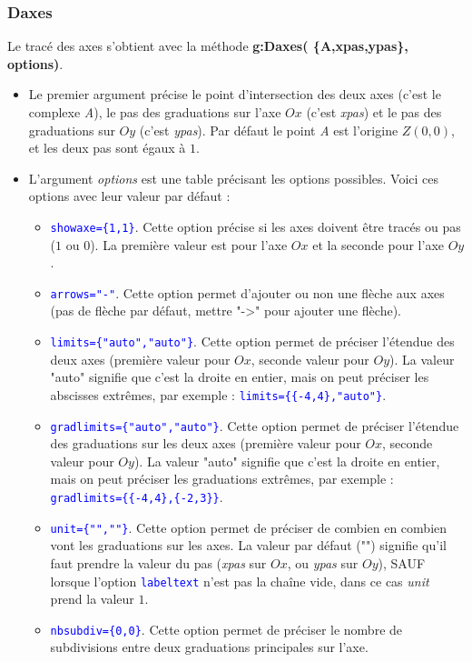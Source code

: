 \subsubsection{Daxes}
\def\opt#1{\textcolor{blue}{\texttt{#1}}}%
Le tracé des axes s'obtient avec la méthode \textbf{g:Daxes( \{A,xpas,ypas\}, options)}.
\begin{itemize}
    \item Le premier argument précise le point d'intersection des deux axes (c'est le complexe \emph{A}), le pas des graduations sur l'axe $Ox$ (c'est \emph{xpas}) et le pas des graduations sur $Oy$ (c'est \emph{ypas}). Par défaut le point \emph{A} est l'origine $Z(0,0)$, et les deux pas sont égaux à $1$.
    \item L'argument \emph{options} est une table précisant les options possibles. Voici ces options avec leur valeur par défaut :
        \begin{itemize}
            \item \opt{showaxe=\{1,1\}}. Cette option précise si les axes doivent être tracés ou pas ($1$ ou $0$). La première valeur est pour l'axe $Ox$ et la seconde pour l'axe $Oy$.
            \item \opt{arrows="-"}. Cette option permet d'ajouter ou non une flèche aux axes (pas de flèche par défaut, mettre "->" pour ajouter une flèche).
            \item \opt{limits=\{"auto","auto"\}}. Cette option permet de préciser l'étendue des deux axes (première valeur pour $Ox$, seconde valeur pour $Oy$). La valeur "auto" signifie que c'est la droite en entier, mais on peut préciser les abscisses extrêmes, par exemple : \opt{limits=\{\{-4,4\},"auto"\}}.
            \item \opt{gradlimits=\{"auto","auto"\}}. Cette option permet de préciser l'étendue des graduations sur les deux axes (première valeur pour $Ox$, seconde valeur pour $Oy$). La valeur "auto" signifie que c'est la droite en entier, mais on peut préciser les graduations extrêmes, par exemple : \opt{gradlimits=\{\{-4,4\},\{-2,3\}\}}.
            \item \opt{unit=\{"",""\}}. Cette option permet de préciser de combien en combien vont les graduations sur les axes. La valeur par défaut ("") signifie qu'il faut prendre la valeur du pas (\emph{xpas} sur $Ox$, ou \emph{ypas} sur $Oy$), SAUF lorsque l'option \opt{labeltext} n'est pas la chaîne vide, dans ce cas \emph{unit} prend la valeur $1$.
            \item \opt{nbsubdiv=\{0,0\}}. Cette option permet de préciser le nombre de subdivisions entre deux graduations principales sur l'axe.

\end{itemize}
\end{itemize}
